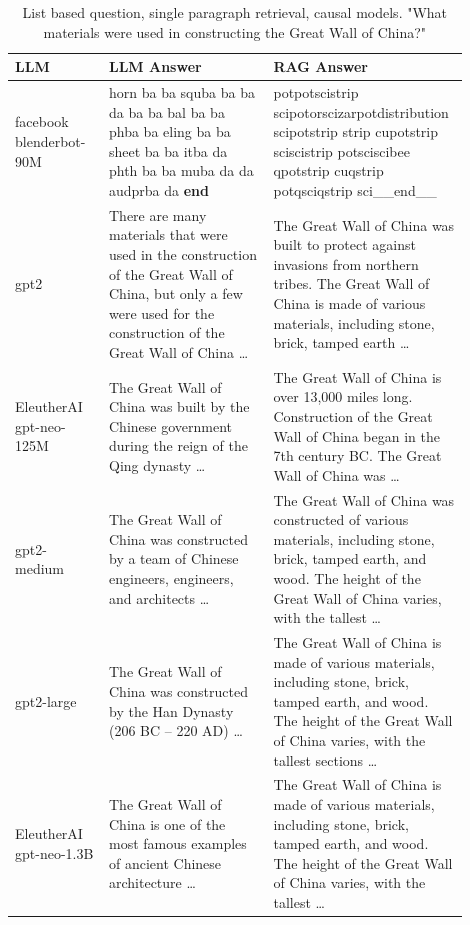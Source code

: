 \documentclass{wseas}
\begin{document}
\begin{table}[htbp]
  \centering
  \caption{List based question, single paragraph retrieval, causal models. "What materials were used in constructing the Great Wall of China?"}
  \label{tab:experiment_R_1_paragraph_Q_listBased_M_casual_table}
  \begin{tabular}{|p{0.20\linewidth}|p{0.35\linewidth}|p{0.35\linewidth}|}
    \hline
    \textbf{LLM} & \textbf{LLM Answer} & \textbf{RAG Answer} \\
    \hline
    facebook blenderbot-90M & horn ba ba squba ba ba da ba ba bal ba ba phba ba eling ba ba sheet ba ba itba da phth ba ba muba da da audprba da \textbf{end} & potpotscistrip scipotorscizarpotdistribution scipotstrip strip cupotstrip sciscistrip potsciscibee qpotstrip cuqstrip potqsciqstrip sci\_\_end\_\_ \\
    \hline
    gpt2 & There are many materials that were used in the construction of the Great Wall of China, but only a few were used for the construction of the Great Wall of China \ldots{} & The Great Wall of China was built to protect against invasions from northern tribes. The Great Wall of China is made of various materials, including stone, brick, tamped earth \ldots{} \\
    \hline
    EleutherAI gpt-neo-125M & The Great Wall of China was built by the Chinese government during the reign of the Qing dynasty \ldots{} & The Great Wall of China is over 13,000 miles long. Construction of the Great Wall of China began in the 7th century BC. The Great Wall of China was \ldots{} \\
    \hline
    gpt2-medium & The Great Wall of China was constructed by a team of Chinese engineers, engineers, and architects \ldots{} & The Great Wall of China was constructed of various materials, including stone, brick, tamped earth, and wood. The height of the Great Wall of China varies, with the tallest \ldots{} \\
    \hline
    gpt2-large & The Great Wall of China was constructed by the Han Dynasty (206 BC -- 220 AD) \ldots{} & The Great Wall of China is made of various materials, including stone, brick, tamped earth, and wood. The height of the Great Wall of China varies, with the tallest sections \ldots{} \\
    \hline
    EleutherAI gpt-neo-1.3B & The Great Wall of China is one of the most famous examples of ancient Chinese architecture \ldots{} & The Great Wall of China is made of various materials, including stone, brick, tamped earth, and wood. The height of the Great Wall of China varies, with the tallest \ldots{} \\
    \hline
  \end{tabular}
\end{table}
\end{document}
